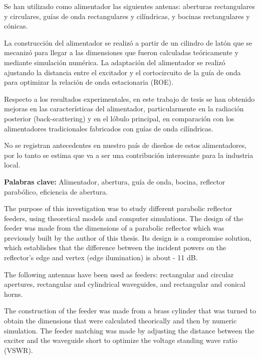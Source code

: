 \documentclass[a4paper, 11pt, twoside]{Thesis}  %
\begin{document}
Se han utilizado como alimentador las siguientes antenas: aberturas rectangulares y circulares, guías de onda rectangulares y cilíndricas, y bocinas rectangulares y cónicas.

La construcción del alimentador se realizó a partir de un cilindro de latón que se mecanizó para llegar a las dimensiones que fueron calculadas teóricamente y mediante simulación numérica. La adaptación del alimentador se realizó ajustando la distancia entre el excitador y el cortocircuito de la guía de onda para optimizar la relación de onda estacionaria (ROE).

Respecto a los resultados experimentales, en este trabajo de tesis se han obtenido mejoras en las características del alimentador, particularmente en la radiación posterior (back-scattering) y en el lóbulo principal, en comparación con los alimentadores tradicionales fabricados con guías de onda cilíndricas.

No se registran antecedentes en nuestro país de diseños de estos alimentadores, por lo tanto se estima que va a ser una contribución interesante para la industria local.

\textbf{Palabras clave:} Alimentador, abertura, guía de onda, bocina, reflector parabólico, eficiencia de abertura.

\clearpage


\begin{center}
\bigskip
\end{center}

The purpose of this investigation was to study different parabolic reflector feeders, using theoretical models and computer simulations. The design of the feeder was made from the dimensions of a parabolic reflector which was previously built by the author of this thesis. Its design is a compromise solution, which establishes that the difference between the incident powers on the reflector's edge and vertex (edge ilumination) is about - 11 dB.

The following antennas have been used as feeders: rectangular and circular apertures, rectangular and cylindrical waveguides, and rectangular and conical horns.

The construction of the feeder was made from a brass cylinder that was turned to obtain the dimensions that were calculated theorically and then by numeric simulation. The feeder matching was made by adjusting the distance between the exciter and the waveguide short to optimize the voltage standing wave ratio (VSWR).
\end{document}
